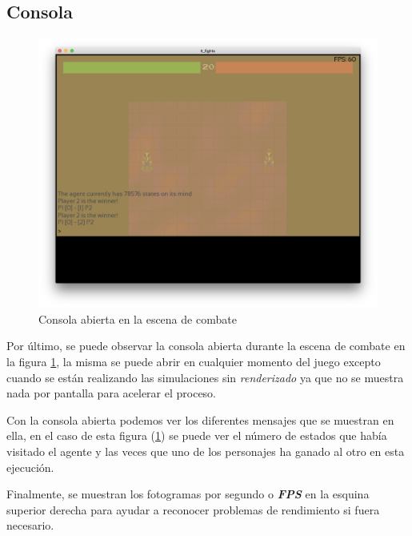 \subsection{Consola}

\begin{figure}[h]
	\centerline{\includegraphics[width=17cm]{otros/manual/consola.png}}
	\caption{Consola abierta en la escena de combate}
	\label{uso:consola}
\end{figure}

Por último, se puede observar la consola abierta durante la escena de combate en la figura \ref{uso:consola}, la misma se puede abrir en cualquier momento del juego excepto cuando se están realizando las simulaciones sin \textit{renderizado} ya que no se muestra nada por pantalla para acelerar el proceso.

\bigskip

Con la consola abierta podemos ver los diferentes mensajes que se muestran en ella, en el caso de esta figura (\ref{uso:consola}) se puede ver el número de estados que había visitado el agente y las veces que uno de los personajes ha ganado al otro en esta ejecución.

\bigskip

Finalmente, se muestran los fotogramas por segundo o \textbf{\textit{FPS}} en la esquina superior derecha para ayudar a reconocer problemas de rendimiento si fuera necesario.


